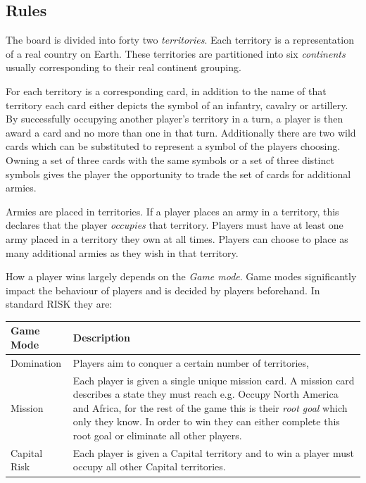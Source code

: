 \documentclass[parskip]{cs4rep}
\begin{document}
\subsection{Rules}

The board is divided into forty two \textit{territories}. Each territory is a representation of a real country on Earth. These territories are partitioned into six \textit{continents} usually corresponding to their real continent grouping.

For each territory is a corresponding card, in addition to the name of that territory each card either depicts the symbol of an infantry, cavalry or artillery. By successfully occupying another player's territory in a turn, a player is then award a card and no more than one in that turn. Additionally there are two wild cards which can be substituted to represent a symbol of the players choosing.
Owning a set of three cards with the same symbols or a set of three distinct symbols gives the player the opportunity to trade the set of cards for additional armies.

Armies are placed in territories. If a player places an army in a territory, this declares that the player \textit{occupies} that territory. Players must have at least one army placed in a territory they own at all times. Players can choose to place as many additional armies as they wish in that territory.

How a player wins largely depends on the \textit{Game mode}. Game modes significantly impact the behaviour of players and is decided by players beforehand. In standard RISK they are:
\newline

\begin{tabular}{|l|p{11cm}|}
\hline 
\textbf{Game Mode} & \textbf{Description} \\ 
\hline 
Domination & Players aim to conquer a certain number of territories, \\ 
\hline 
Mission & Each player is given a single unique mission card. A mission card describes a state they must reach e.g. Occupy North America and Africa, for the rest of the game this is their \textit{root goal} which only they know. In order to win they can either complete this root goal or eliminate all other players. \\ 
\hline 
Capital Risk & Each player is given a Capital territory and to win a player must occupy all other Capital territories. \\ 
\hline
\end{tabular} 
\newline
\end{document}
